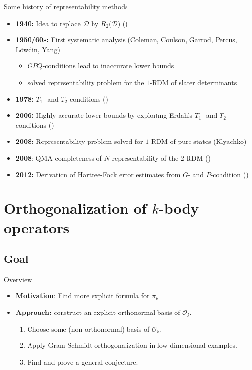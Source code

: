 \documentclass{beamer}
\newcommand{\DensityMatrices}{\mathcal{D}}
\newcommand{\kbOp}[1][k]{{\ensuremath{\mathcal{O}_{#1}}}}
\begin{document}
\begin{frame}{Some history of representability methods}
    \begin{itemize}
        \item \textbf{1940:} Idea to replace $\DensityMatrices$ by $R_2(\DensityMatrices$) (\citeauthor{Husimi1940})
        \item \textbf{1950/60s:} First systematic analysis (Coleman, Coulson, Garrod, Percus, Löwdin, Yang)
        \begin{itemize}
            \item $GPQ$-conditions lead to inaccurate lower bounds
            \item solved representability problem for the $1$-RDM of slater determinants
        \end{itemize}
        \item \textbf{1978:} $T_1$- and $T_2$-conditions (\citeauthor{Erdahl1978})
        \item \textbf{2006:} Highly accurate lower bounds by exploiting Erdahls
          $T_1$- and $T_2$-conditions (\citeauthor{Cances2006})
        \item \textbf{2008:} Representability problem solved for $1$-RDM of
          pure states (Klyachko)
        \item \textbf{2008}: QMA-completeness of $N$-representability of the $2$-RDM (\citeauthor{Liu2006})
        \item \textbf{2012:} Derivation of Hartree-Fock error estimates from
          $G$- and $P$-condition (\citeauthor{Bach2012})
    \end{itemize}
\end{frame}

\section{Orthogonalization of $k$-body operators}
\subsection{Goal}
\begin{frame}{Overview}
\begin{itemize}
    \item \textbf{Motivation}: Find more explicit formula for $\pi_k$
    \item<3-> \textbf{Approach:} construct an explicit orthonormal basis of $\kbOp$.
    \begin{enumerate}
        \item Choose some (non-orthonormal) basis of $\kbOp$.
        \item Apply Gram-Schmidt orthogonalization in low-dimensional examples.
        \item Find and prove a general conjecture.
    \end{enumerate}
\end{itemize}
\end{frame}
\end{document}
